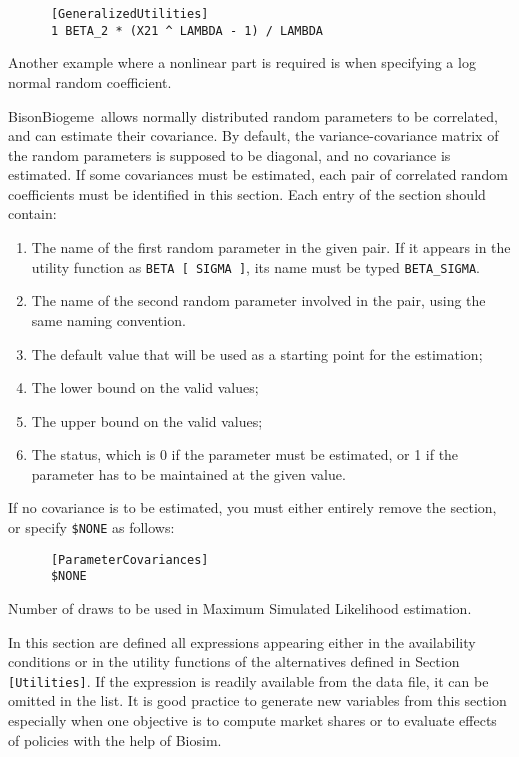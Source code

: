 \documentclass[12pt,a4paper]{article}
\newcommand{\specitem}[1]{\texttt{[#1]}}
\newcommand{\BBIOGEME}{BisonBiogeme}
\begin{document}
\begin{description}
\begin{verbatim}
      [GeneralizedUtilities]
      1 BETA_2 * (X21 ^ LAMBDA - 1) / LAMBDA
      \end{verbatim}
      
      Another example where a nonlinear part is required is when specifying a log normal 
      random coefficient. 
      
   \item[\specitem{ParameterCovariances}]
      \BBIOGEME\ allows normally distributed random parameters to be correlated, and can estimate
      their covariance. By default, the variance-covariance matrix of the
      random parameters is supposed to be diagonal, and no covariance is
      estimated. If some covariances must be estimated, each pair of correlated 
      random coefficients must be identified in this section. 
      Each entry of the section should contain: 
      \begin{enumerate}
         \item The name of the first random parameter in the given pair. If it appears in the
            utility function as \verb+BETA [ SIGMA ]+, its name must be typed
            \verb+BETA_SIGMA+. 
         \item The name of the second random parameter involved in the pair, using the same naming
            convention. 
         \item The default value that will be used as a starting point for the estimation;
         \item The lower bound on the valid values;
         \item The upper bound on the valid values;
         \item The status, which is 0 if the parameter must be estimated, or 1 if the parameter 
            has to be maintained at the given value. 
      \end{enumerate}
      If no covariance is to be estimated, you must either entirely remove
      the section, or specify \verb+$NONE+ as follows:
      \begin{verbatim}
      [ParameterCovariances]
      $NONE
      \end{verbatim}


   \item[\specitem{Draws}] Number of draws to be used in Maximum Simulated Likelihood estimation. 

   \item[\specitem{Expressions}]
      In this section are defined all expressions appearing either in the
      availability conditions or in the utility functions of the alternatives
      defined in Section \verb+[Utilities]+. If the expression is
      readily available from the data file, it can be omitted in the list. 
It is good practice to generate new variables from this 
      section especially when one objective is to compute market shares or to evaluate effects of 
      policies with the help of Biosim.


\end{description}
\end{document}
